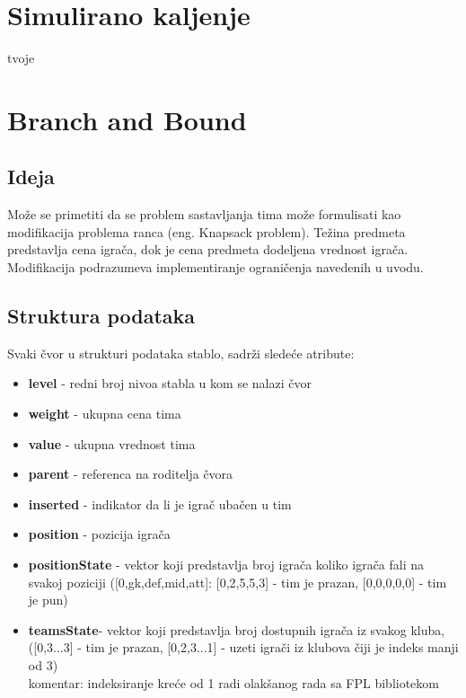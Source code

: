 \documentclass[a4paper]{article}
\begin{document}
\section{Simulirano kaljenje}
tvoje
\section{Branch and Bound}
\vspace{5mm} 
\subsection{Ideja}
\vspace{3mm} 
Može se primetiti da se problem sastavljanja tima može formulisati kao modifikacija problema ranca (eng. Knapsack problem). Težina predmeta predstavlja cena igrača, dok je cena predmeta dodeljena vrednost igrača. Modifikacija podrazumeva implementiranje ograničenja navedenih u uvodu.

\subsection{Struktura podataka}
\vspace{3mm} 
Svaki čvor u strukturi podataka stablo, sadrži sledeće atribute: \\
\begin{itemize}
	\item \textbf{level} - redni broj nivoa stabla u kom se nalazi čvor
	\item \textbf{weight} - ukupna cena tima
	\item \textbf{value} - ukupna vrednost tima
	\item \textbf{parent} - referenca na roditelja čvora
	\item \textbf{inserted} - indikator da li je igrač ubačen u tim
	\item \textbf{position} - pozicija igrača
	\item \textbf{positionState} - vektor koji predstavlja broj igrača koliko igrača fali na svakoj poziciji ([0,gk,def,mid,att]: [0,2,5,5,3] - tim je prazan, [0,0,0,0,0] - tim je pun)
	\item \textbf{teamsState}-  vektor koji predstavlja broj dostupnih igrača iz svakog kluba, ([0,3...3] - tim je prazan, [0,2,3...1] - uzeti igrači iz klubova čiji je indeks manji od 3) \\
	
	komentar: indeksiranje kreće od 1 radi olakšanog rada sa FPL bibliotekom

\end{itemize}
\end{document}
